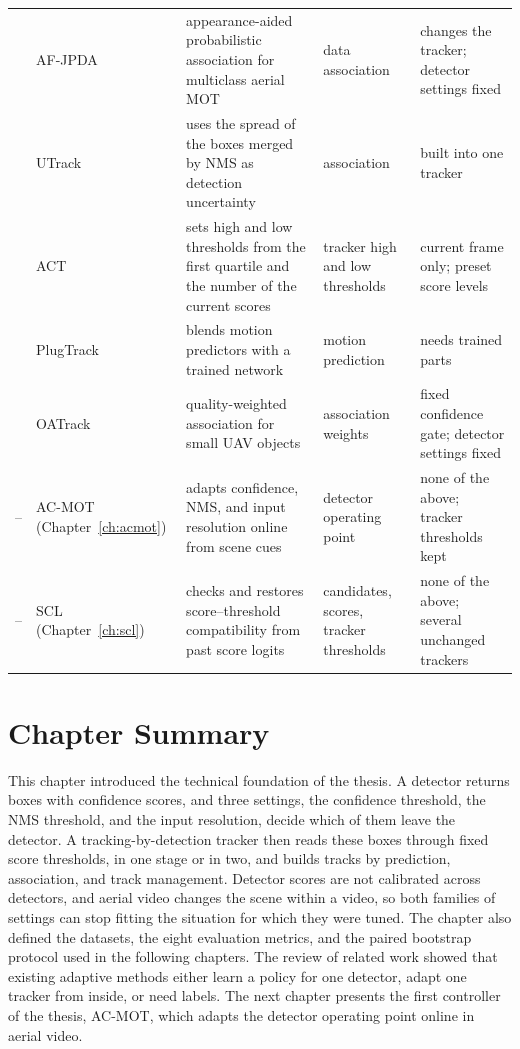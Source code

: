 \begin{table}[tbp]
\begin{tabular}{>{\raggedright\arraybackslash}p{0.9cm}>{\raggedright\arraybackslash}p{2.5cm}>{\raggedright\arraybackslash}p{3.8cm}>{\raggedright\arraybackslash}p{2.2cm}>{\raggedright\arraybackslash}p{3.3cm}}
2024 & AF-JPDA \cite{kim2024afjpda} & appearance-aided probabilistic association for multiclass aerial MOT & data association & changes the tracker; detector settings fixed \\
2025 & UTrack \cite{solano2025utrack} & uses the spread of the boxes merged by NMS as detection uncertainty & association & built into one tracker \\
2026 & ACT \cite{act2026adaptive} & sets high and low thresholds from the first quartile and the number of the current scores & tracker high and low thresholds & current frame only; preset score levels \\
2026 & PlugTrack \cite{kim2026plugtrack} & blends motion predictors with a trained network & motion prediction & needs trained parts \\
2026 & OATrack \cite{qi2026oatrack} & quality-weighted association for small UAV objects & association weights & fixed confidence gate; detector settings fixed \\
\midrule
-- & AC-MOT (Chapter~\ref{ch:acmot}) & adapts confidence, NMS, and input resolution online from scene cues & detector operating point & none of the above; tracker thresholds kept \\
-- & SCL (Chapter~\ref{ch:scl}) & checks and restores score--threshold compatibility from past score logits & candidates, scores, tracker thresholds & none of the above; several unchanged trackers \\
\bottomrule
\end{tabular}
\end{table}

\section{Chapter Summary}\label{sec:bg-summary}
This chapter introduced the technical foundation of the thesis. A detector returns boxes with confidence scores, and three settings, the confidence threshold, the NMS threshold, and the input resolution, decide which of them leave the detector. A tracking-by-detection tracker then reads these boxes through fixed score thresholds, in one stage or in two, and builds tracks by prediction, association, and track management. Detector scores are not calibrated across detectors, and aerial video changes the scene within a video, so both families of settings can stop fitting the situation for which they were tuned. The chapter also defined the datasets, the eight evaluation metrics, and the paired bootstrap protocol used in the following chapters. The review of related work showed that existing adaptive methods either learn a policy for one detector, adapt one tracker from inside, or need labels. The next chapter presents the first controller of the thesis, AC-MOT, which adapts the detector operating point online in aerial video.
